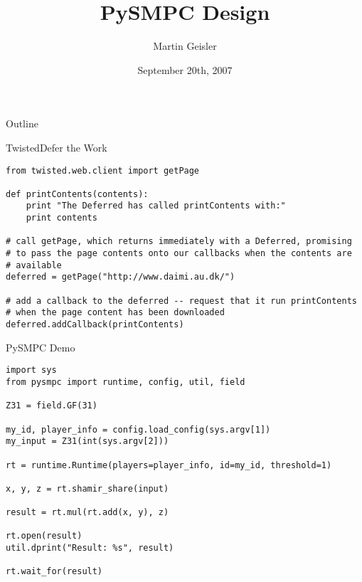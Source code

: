 \documentclass{beamer}
\title{PySMPC Design}
\author{Martin Geisler}
\institute[BRICS]{
  BRICS\\
  Department of Computer Science\\
  University of Aarhus
}
\date{September 20th, 2007}
\begin{document}
\begin{frame}
  \titlepage
\end{frame}

\begin{frame}{Outline}
  \tableofcontents
\end{frame}


\begin{frame}[fragile]{Twisted}{Defer the Work}

\begin{lstlisting}
from twisted.web.client import getPage

def printContents(contents):
    print "The Deferred has called printContents with:"
    print contents

# call getPage, which returns immediately with a Deferred, promising
# to pass the page contents onto our callbacks when the contents are
# available
deferred = getPage("http://www.daimi.au.dk/")

# add a callback to the deferred -- request that it run printContents
# when the page content has been downloaded
deferred.addCallback(printContents)
\end{lstlisting}

\end{frame}

\begin{frame}[fragile]{PySMPC Demo}

\begin{lstlisting}
import sys
from pysmpc import runtime, config, util, field

Z31 = field.GF(31)

my_id, player_info = config.load_config(sys.argv[1])
my_input = Z31(int(sys.argv[2]))

rt = runtime.Runtime(players=player_info, id=my_id, threshold=1)

x, y, z = rt.shamir_share(input)

result = rt.mul(rt.add(x, y), z)

rt.open(result)
util.dprint("Result: %s", result)

rt.wait_for(result)
\end{lstlisting}

\end{frame}
\end{document}
